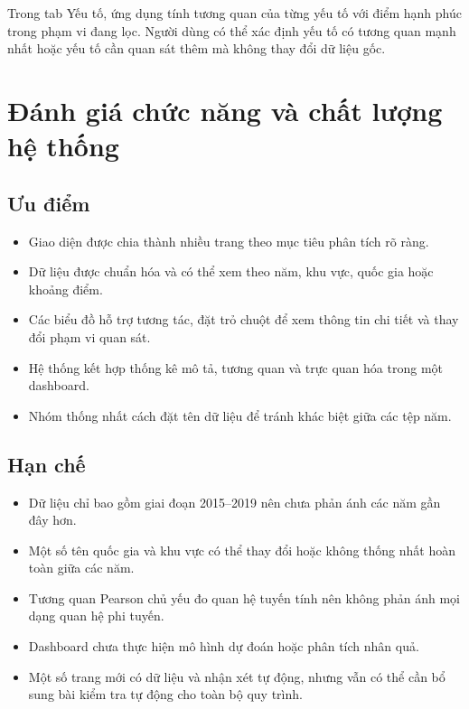 Trong tab Yếu tố, ứng dụng tính tương quan của từng yếu tố với điểm hạnh phúc trong phạm vi đang lọc. Người dùng có thể xác định yếu tố có tương quan mạnh nhất hoặc yếu tố cần quan sát thêm mà không thay đổi dữ liệu gốc.

\section{Đánh giá chức năng và chất lượng hệ thống}

\subsection{Ưu điểm}

\begin{itemize}
    \item Giao diện được chia thành nhiều trang theo mục tiêu phân tích rõ ràng.
    \item Dữ liệu được chuẩn hóa và có thể xem theo năm, khu vực, quốc gia hoặc khoảng điểm.
    \item Các biểu đồ hỗ trợ tương tác, đặt trỏ chuột để xem thông tin chi tiết và thay đổi phạm vi quan sát.
    \item Hệ thống kết hợp thống kê mô tả, tương quan và trực quan hóa trong một dashboard.
    \item Nhóm thống nhất cách đặt tên dữ liệu để tránh khác biệt giữa các tệp năm.
\end{itemize}

\subsection{Hạn chế}

\begin{itemize}
    \item Dữ liệu chỉ bao gồm giai đoạn 2015--2019 nên chưa phản ánh các năm gần đây hơn.
    \item Một số tên quốc gia và khu vực có thể thay đổi hoặc không thống nhất hoàn toàn giữa các năm.
    \item Tương quan Pearson chủ yếu đo quan hệ tuyến tính nên không phản ánh mọi dạng quan hệ phi tuyến.
    \item Dashboard chưa thực hiện mô hình dự đoán hoặc phân tích nhân quả.
    \item Một số trang mới có dữ liệu và nhận xét tự động, nhưng vẫn có thể cần bổ sung bài kiểm tra tự động cho toàn bộ quy trình.
\end{itemize}

